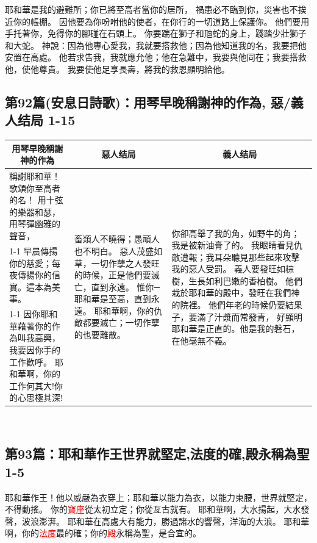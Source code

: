 耶和華是我的避難所；你已將至高者當你的居所，
禍患必不臨到你，災害也不挨近你的帳棚。
因他要為你吩咐他的使者，在你行的一切道路上保護你。
他們要用手托著你，免得你的腳碰在石頭上。
你要踹在獅子和虺蛇的身上，踐踏少壯獅子和大蛇。
神說：因為他專心愛我，我就要搭救他；因為他知道我的名，我要把他安置在高處。
他若求告我，我就應允他；他在急難中，我要與他同在；我要搭救他，使他尊貴。
我要使他足享長壽，將我的救恩顯明給他。

\subsection{第92篇(安息日詩歌)：用琴早晚稱謝神的作為, 惡/義人结局 1-15}
\begin{table}[H]
\centering
\begin{tabular}{p{5.75cm}|p{4.400cm}|p{6.8cm}}\hline\hline
\multicolumn{1}{c|}{用琴早晚稱謝神的作為}&\multicolumn{1}{c|}{惡人结局}&\multicolumn{1}{c}{義人结局}\\\hline
稱謝耶和華！歌頌你至高者的名！
用十弦的樂器和瑟，用琴彈幽雅的聲音，
&\multirow{3}{4.6cm}{畜類人不曉得；愚頑人也不明白。
惡人茂盛如草，一切作孽之人發旺的時候，正是他們要滅亡，直到永遠。
惟你─耶和華是至高，直到永遠。
耶和華啊，你的仇敵都要滅亡；一切作孽的也要離散。}
&\multirow{3}{7.2cm}{你卻高舉了我的角，如野牛的角；我是被新油膏了的。
我眼睛看見仇敵遭報；我耳朵聽見那些起來攻擊我的惡人受罰。
義人要發旺如棕樹，生長如利巴嫩的香柏樹。
他們栽於耶和華的殿中，發旺在我們神的院裡。
他們年老的時候仍要結果子，要滿了汁漿而常發青，
好顯明耶和華是正直的。他是我的磐石，在他毫無不義。}\\\cline{1-1}
早晨傳揚你的慈愛；每夜傳揚你的信實。這本為美事。
&&\\\cline{1-1}
因你耶和華藉著你的作為叫我高興，我要因你手的工作歡呼。
耶和華啊，你的工作何其大!你的心思極其深!&&\\\hline
\end{tabular}
\end{table} 

\subsection{第93篇：耶和華作王世界就堅定,法度的確,殿永稱為聖 1-5}
耶和華作王！他以威嚴為衣穿上；耶和華以能力為衣，以能力束腰，世界就堅定，不得動搖。
你的\textcolor{red}{寶座}從太初立定；你從亙古就有。
耶和華啊，大水揚起，大水發聲，波浪澎湃。
耶和華在高處大有能力，勝過諸水的響聲，洋海的大浪。
耶和華啊，你的\textcolor{red}{法度}最的確；你的\textcolor{red}{殿}永稱為聖，是合宜的。

